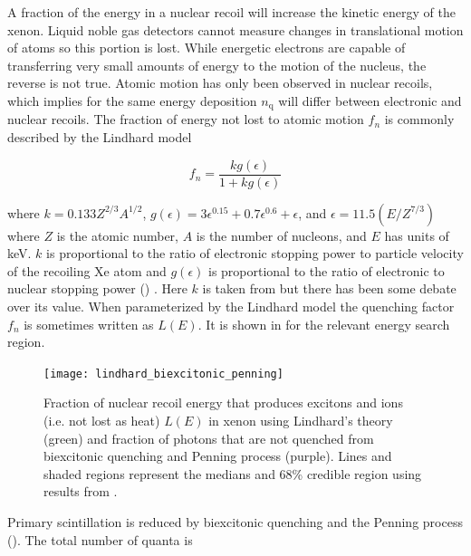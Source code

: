 A fraction of the energy in a nuclear recoil will increase the kinetic energy of the xenon.  Liquid noble gas detectors cannot measure
changes in translational motion of atoms so this portion is lost.  While energetic electrons are capable of transferring very small
amounts of energy to the motion of the nucleus, the reverse is not true.  Atomic motion has only been observed in nuclear recoils,
which implies for the same energy deposition $n_{\mathrm{q}}$ will differ between electronic and nuclear recoils.  The fraction of energy
not lost to atomic motion $f_{n}$ is commonly described by the Lindhard model

\begin{equation}
f_{n} = \frac{k g(\epsilon)}{1 + k g(\epsilon)}
\label{eq:linhard_quenching}
\end{equation}

\noindent where $k = 0.133Z^{2/3}A^{1/2}$, $g(\epsilon) = 3\epsilon^{0.15} + 0.7\epsilon^{0.6} + \epsilon$, and
$\epsilon = 11.5 (E / Z^{7/3})$ where $Z$ is the atomic number, $A$ is the number of nucleons, and $E$ has units of keV.  $k$ is
proportional to the ratio of
electronic stopping power to particle velocity of the recoiling Xe atom  and $g(\epsilon)$ is proportional
to the ratio of electronic to nuclear stopping power () .  Here $k$ is taken
from  but there has been some debate over its value.  When parameterized by the Lindhard model the quenching factor
$f_{n}$ is sometimes written as $L(E)$.  It is shown in  for the relevant energy search region.

\begin{figure}
\texttt{[image: lindhard\_biexcitonic\_penning]}
\caption[Fraction of nuclear recoil energy that produces excitons and ions (i.e. not lost as heat) $L(E)$ in xenon using Lindhard's theory
and fraction of photons that are not quenched from biexcitonic quenching and Penning process.]{Fraction of nuclear recoil energy
that produces excitons and ions (i.e. not lost as heat) $L(E)$ in xenon using Lindhard's theory (green)
 and fraction of photons that are not quenched from biexcitonic quenching and Penning process (purple).  Lines and
shaded regions represent the medians and 68\% credible region using results from .}
\label{fig:lindhard}
\end{figure}

Primary scintillation is reduced by biexcitonic quenching and the Penning process ().  The total
number of quanta is

